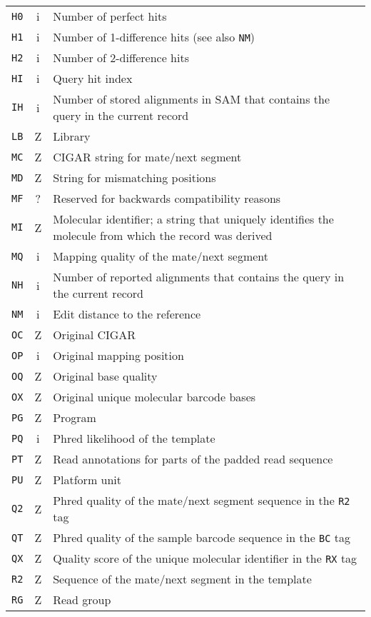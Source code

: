 \documentclass[10pt]{article}
\begin{document}
\begin{center}
\begin{longtable}{ccp{12.5cm}}
  {\tt H0} & i & Number of perfect hits \\
  {\tt H1} & i & Number of 1-difference hits (see also {\tt NM}) \\
  {\tt H2} & i & Number of 2-difference hits \\
  {\tt HI} & i & Query hit index \\
  {\tt IH} & i & Number of stored alignments in SAM that contains the query in the current record \\
  {\tt LB} & Z & Library \\
  {\tt MC} & Z & CIGAR string for mate/next segment \\
  {\tt MD} & Z & String for mismatching positions \\
  {\tt MF} & ? & Reserved for backwards compatibility reasons \\
  {\tt MI} & Z & Molecular identifier; a string that uniquely identifies the molecule from which the record was derived \\
  {\tt MQ} & i & Mapping quality of the mate/next segment \\
  {\tt NH} & i & Number of reported alignments that contains the query in the current record \\
  {\tt NM} & i & Edit distance to the reference \\
  {\tt OC} & Z & Original CIGAR \\
  {\tt OP} & i & Original mapping position \\
  {\tt OQ} & Z & Original base quality \\
  {\tt OX} & Z & Original unique molecular barcode bases \\
  {\tt PG} & Z & Program \\
  {\tt PQ} & i & Phred likelihood of the template \\
  {\tt PT} & Z & Read annotations for parts of the padded read sequence \\
  {\tt PU} & Z & Platform unit \\
  {\tt Q2} & Z & Phred quality of the mate/next segment sequence in the {\tt R2} tag \\
  {\tt QT} & Z & Phred quality of the sample barcode sequence in the {\tt BC} tag \\
  {\tt QX} & Z & Quality score of the unique molecular identifier in the {\tt RX} tag \\
  {\tt R2} & Z & Sequence of the mate/next segment in the template \\
  {\tt RG} & Z & Read group \\

\end{longtable}
\end{center}
\end{document}
